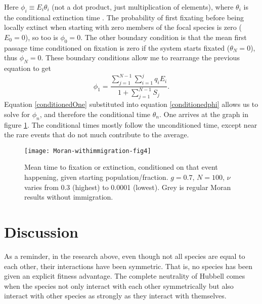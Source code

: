 Here $\phi_i \equiv E_i \theta_i$ (not a dot product, just multiplication of elements), where $\theta_i$ is the conditional extinction time \cite{Iyer-Biswas2015}. 
The probability of first fixating before being locally extinct when starting with zero members of the focal species is zero ($E_0=0$), so too is $\phi_0=0$. 
The other boundary condition is that the mean first passage time conditioned on fixation is zero if the system starts fixated ($\theta_N = 0$), thus $\phi_N = 0$. 
These boundary conditions allow me to rearrange the previous equation to get
\begin{equation}
\phi_1 = \frac{\sum_{j=1}^{N-1}\sum_{i=1}^{j}q_iE_i}{1+\sum_{j=1}^{N-1}S_j}. 
\end{equation} \label{conditionedOne}
Equation \ref{conditionedOne} substituted into equation \ref{conditionedphi} allows us to solve for $\phi_n$, and therefore the conditional time $\theta_n$. 
One arrives at the graph in figure \ref{condextntimefig}. 
The conditional times mostly follow the unconditioned time, except near the rare events that do not much contribute to the average. 
\begin{figure}[ht]
	\centering
	\texttt{[image: Moran-withimmigration-fig4]}
	\caption{Mean time to fixation or extinction, conditioned on that event happening, given starting population/fraction. $g=0.7$, $N=100$, $\nu$ varies from 0.3 (highest) to 0.0001 (lowest). Grey is regular Moran results without immigration. } \label{condextntimefig}
\end{figure}%


\section{Discussion}

As a reminder, in the research above, even though not all species are equal to each other, their interactions have been symmetric. That is, no species has been given an explicit fitness advantage. The complete neutrality of Hubbell comes when the species not only interact with each other symmetrically but also interact with other species as strongly as they interact with themselves. 

